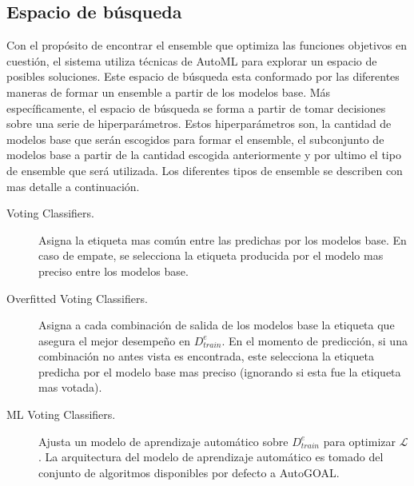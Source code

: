 \subsection{Espacio de búsqueda}

Con el propósito de encontrar el ensemble que optimiza las funciones objetivos en cuestión, el sistema utiliza técnicas de AutoML para explorar un espacio de posibles soluciones.
Este espacio de búsqueda esta conformado por las diferentes maneras de formar un ensemble a partir de los modelos base.
Más específicamente, el espacio de búsqueda se forma a partir de tomar decisiones sobre una serie de hiperparámetros.
Estos hiperparámetros son, la cantidad de modelos base que serán escogidos para formar el ensemble, el subconjunto de modelos base a partir de la cantidad escogida anteriormente y por ultimo el tipo de ensemble que será utilizada.
Los diferentes tipos de ensemble se describen con mas detalle a continuación.

\begin{description}

    \item[Voting Classifiers.]
    Asigna la etiqueta mas común entre las predichas por los modelos base.
    En caso de empate, se selecciona la etiqueta producida por el modelo mas preciso entre los modelos base.
    
    \item[Overfitted Voting Classifiers.]
    Asigna a cada combinación de salida de los modelos base la etiqueta que asegura el mejor desempeño en $D_{train}^e$.
    En el momento de predicción, si una combinación no antes vista es encontrada, este selecciona la etiqueta predicha por el modelo base mas preciso (ignorando si esta fue la etiqueta mas votada).
    
    \item[ML Voting Classifiers.]
    Ajusta un modelo de aprendizaje automático sobre $D_{train}^e$ para optimizar $\mathcal{L}$.
    La arquitectura del modelo de aprendizaje automático es tomado del conjunto de algoritmos disponibles por defecto a AutoGOAL.
    
\end{description}


